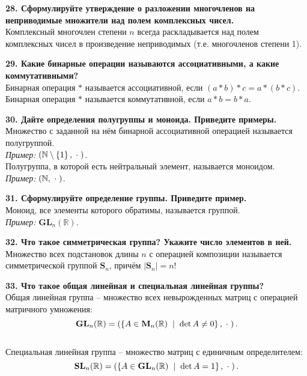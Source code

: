 \documentclass[11pt,a4paper]{article}
\newcommand{\N}{\mathbb{N}}
\newcommand{\R}{\mathbb{R}}
\renewcommand{\mid}{\hspace{2mm}\middle|\hspace{2mm}}
\begin{document}
\textbf{28. Сформулируйте утверждение о разложении многочленов на неприводимые множители над полем комплексных чисел.\\}
Комплексный многочлен степени $n$ всегда раскладывается над полем комплексных чисел в произведение неприводимых (т.е. многочленов степени 1).

\textbf{29. Какие бинарные операции называются ассоциативными, а какие коммутативными?\\}
Бинарная операция $*$ называется ассоциативной, если $(a * b) * c = a * (b * c)$.\\
Бинарная операция $*$ называется коммутативной, если $a * b= b * a$.

\textbf{30. Дайте определения полугруппы и моноида. Приведите примеры.\\}
Множество с заданной на нём бинарной ассоциативной операцией называется полугруппой.\\
\textit{Пример:} $\left( \N \setminus \left\{ 1 \right\}, \hspace{1mm} \cdot \hspace{1mm} \right)$.\\
Полугруппа, в которой есть нейтральный элемент, называется моноидом.\\
\textit{Пример:} $\left( \N, \hspace{1mm} \cdot \hspace{1mm} \right)$.

\textbf{31. Сформулируйте определение группы. Приведите пример.\\}
Моноид, все элементы которого обратимы, называется группой.\\
\textit{Пример:} $\mathbf{GL}_n ( \R )$.

\textbf{32. Что такое симметрическая группа? Укажите число элементов в ней.\\}
Множество всех подстановок длины $n$ с операцией композиции называется симметрической группой $\mathbf{S}_n$, причём $\left\vert \mathbf{S}_n \right\vert = n!$

\textbf{33. Что такое общая линейная и специальная линейная группы?\\}
Общая линейная группа -- множество всех невырожденных матриц с операцией матричного умножения: $$\mathbf{GL}_n( \R ) = \left( \left\{ A \in \mathbf{M}_n( \R ) \mid \det A \neq 0 \right\}, \hspace{1mm} \cdot \hspace{1mm} \right).$$\\
Специальная линейная группа -- множество матриц с единичным определителем: $$\mathbf{SL}_n( \R ) = \left( \left\{ A \in \mathbf{GL}_n( \R ) \mid \det A = 1 \right\}, \hspace{1mm} \cdot \hspace{1mm} \right).$$
\end{document}
